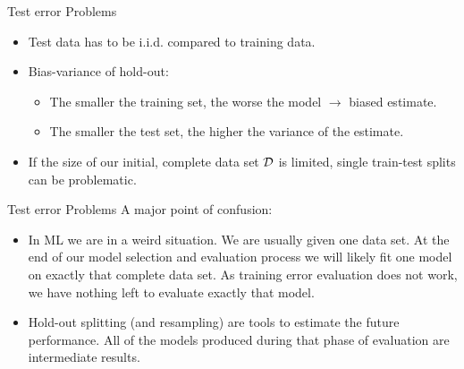 \documentclass[11pt,compress,t,notes=noshow, xcolor=table]{beamer}
\begin{document}
\begin{vbframe}{Test error Problems}
\begin{itemize}
  \item Test data has to be i.i.d. compared to training data.
  \item Bias-variance of hold-out:\\
  \begin{itemize}
    \item The smaller the training set, the worse the model $\rightarrow$ biased estimate.\\
    \item The smaller the test set, the higher the variance of the estimate.
  \end{itemize}   
  \item If the size of our initial, complete data set $\mathcal{D}$ is limited,
  single train-test splits can be problematic.
\end{itemize}
\end{vbframe}

\begin{vbframe}{Test error Problems}
A major point of confusion:
\begin{itemize}
\item In ML we are in a weird situation. We are usually given one data set. At the end of our model selection and evaluation process
we will likely fit one model on exactly that complete data set. As training error evaluation does not work,
we have nothing left to evaluate exactly that model.
\item Hold-out splitting (and resampling) are tools to estimate the future
performance. All of the models produced during that phase of evaluation are intermediate results.
\end{itemize}
\end{vbframe}



% 
% 
% 
% 
% 
\end{document}
